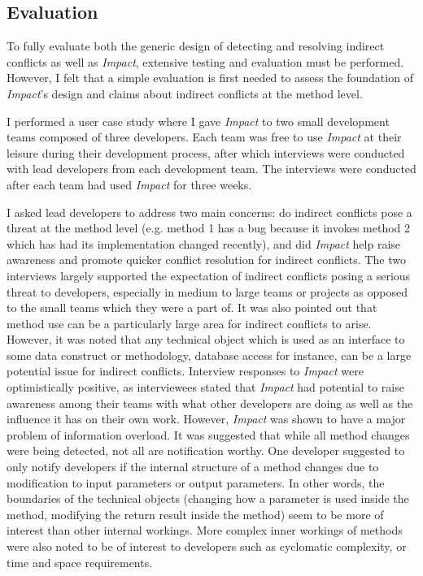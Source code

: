 \subsection{Evaluation}
To fully evaluate both the generic design of detecting and resolving
indirect conflicts as well as \textit{Impact}, extensive testing and evaluation
must be performed. However, I felt that a simple evaluation is
first needed to assess the foundation of \textit{Impact}'s design and claims
about indirect conflicts at the method level.

I performed a user case study where I gave \textit{Impact} to 
two small development teams composed of three developers. Each team was
free to use \textit{Impact} at their leisure during their development process,
after which interviews were conducted with lead developers from 
each development team. The interviews were conducted after each
team had used \textit{Impact} for three weeks.

I asked lead developers to address two main concerns: do indirect
conflicts pose a threat
at the method level (e.g. method 1 has a bug because it invokes method
2 which has had its implementation changed recently), 
and did \textit{Impact} help raise
awareness and promote quicker conflict resolution for indirect
conflicts. The two interviews largely supported the expectation of
indirect conflicts posing a serious threat to developers, especially
in medium to large teams or projects as opposed to the small
teams which they were a part of. It was also pointed
out that method use can be a particularly large area for indirect
conflicts to arise. However, it was noted that
any technical object which is used as an interface to some data
construct or methodology, database access for instance, can be 
a large potential issue for indirect conflicts.  Interview responses to
\textit{Impact} were optimistically positive, as interviewees stated that \textit{Impact}
had potential to raise awareness among their teams with what other developers
are doing as well as the influence it has on their own work. However,
\textit{Impact} was shown to have a major problem of information overload. 
It was suggested
that while all method changes were being detected,
not all are notification worthy. One developer suggested to only notify
developers if the internal structure of a method
changes due to modification to input parameters or output parameters.
In other words, the boundaries of the technical objects (changing
how a parameter is used inside the method, modifying the return
result inside the method) seem to be more of interest than other 
internal workings. More complex inner workings of methods were also noted 
to be of interest to developers
such as cyclomatic complexity, or time and space requirements.

